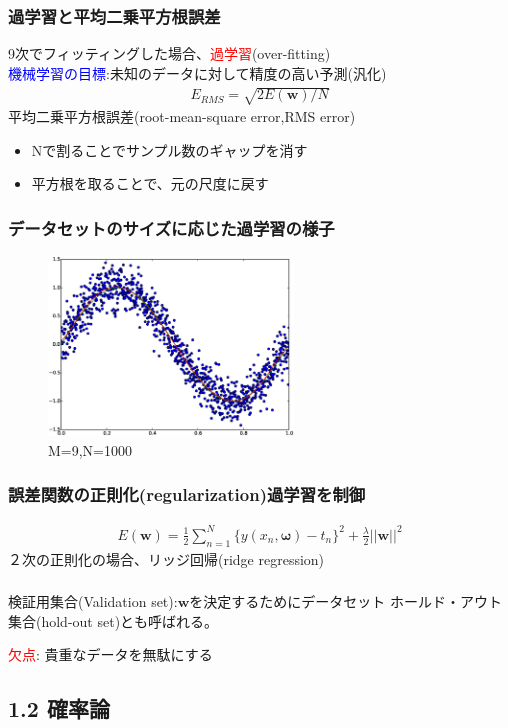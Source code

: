 \documentclass[dvipdfmx]{beamer}
\theoremstyle{definition}
\begin{document}
\begin{frame}
  \frametitle{過学習と平均二乗平方根誤差}
  9次でフィッティングした場合、\textcolor{red}{過学習}(over-fitting)
  \\
  \textcolor{blue}{機械学習の目標}:未知のデータに対して精度の高い予測(汎化)
  \begin{gather*}
    E_{RMS} = \sqrt{2E(\bm{w})/N}
  \end{gather*}
  平均二乗平方根誤差(root-mean-square error,RMS error)
  \\
  \begin{itemize}
    \item Nで割ることでサンプル数のギャップを消す
    \item 平方根を取ることで、元の尺度に戻す
  \end{itemize}
\end{frame}
\begin{frame}
  \frametitle{データセットのサイズに応じた過学習の様子}
  \begin{figure}[htb]
    \centering
    \includegraphics[width=6.5cm,clip]{res/over_fit_lerge_data.eps}
    \caption{M=9,N=1000}
  \end{figure}
\end{frame}
\begin{frame}
  \frametitle{誤差関数の正則化(regularization)過学習を制御}
  \begin{gather*}
    E(\bm{w}) = \frac{1}{2} \sum_{n=1}^{N} \{ y(x_n,\bm{\omega})- t_n \}^2 + \frac{\lambda}{2}||\bm{w} ||^2
  \end{gather*}
  ２次の正則化の場合、リッジ回帰(ridge regression)
\end{frame}

\begin{frame}
  \frametitle{}
  検証用集合(Validation set):$\bm{w}$を決定するためにデータセット ホールド・アウト集合(hold-out set)とも呼ばれる。
  
  \textcolor{red}{欠点}: 貴重なデータを無駄にする
\end{frame}

\subsection{1.2 確率論}
\end{document}
